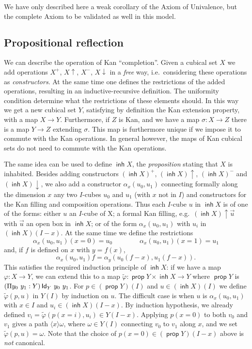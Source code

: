 \documentclass[10pt,a4paper]{article}
\DeclareMathOperator{\inh}{\mathsf{inh}}
\DeclareMathOperator{\propos}{\mathsf{prop}}
\newcommand{\Id}{{\sf Id}}
\newcommand{\rup}[1]{#1{\uparrow}}
\newcommand{\rdo}[1]{#1{\downarrow}}
\newcommand{\bind}[2]{{\langle}#1{\rangle}#2}
\begin{document}
\medskip

 We have only described here a weak corollary of the Axiom of Univalence, but 
the complete Axiom to be validated as well in this model.


\subsection{Propositional reflection}

We can describe the operation of Kan ``completion''. Given a cubical
set $X$ we add operations $X^+$, $\rup X$, $X^-$, $\rdo X$ in
a {\em free} way, i.e.\ considering these operations as {\em
  constructors}.  At the same time one defines the restrictions of the
added operations, resulting in an inductive-recursive definition.  The
uniformity condition determine what the restrictions of these elements
should.  In this way we get a new cubical set $Y$, satisfying by
definition the Kan extension property, with a map $X \to Y$.
Furthermore, if $Z$ is Kan, and we have a map $\sigma:X\to Z$ there is
a map $Y\to Z$ extending $\sigma$.  This map is furthermore unique if
we impose it to commute with the Kan operations.  In general however,
the maps of Kan cubical sets do not need to commute with the Kan
operations.

The same idea can be used to define $\inh X$, the {\em proposition}
stating that $X$ is inhabited.  Besides adding constructors $(\inh
X)^+$, $\rup {(\inh X)}$, $(\inh X)^-$ and $\rdo{(\inh X)}$, we
also add a constructor $\alpha_x(u_0,u_1)$ connecting formally along
the dimension $x$ any two $I$-cubes $u_0$ and $u_1$ (with $x$ not in
$I$) and constructors for the Kan filling and composition operations.
Thus each $I$-cube $u$ in $\inh X$ is of one of the forms: either $u$
an $I$-cube of X; a formal Kan filling, e.g.\ $\rup {(\inh X)} {\vec
  u}$ with $\vec u$ an open box in $\inh X$; or of the form
$\alpha_x(u_0,u_1)$ with $u_i$ in $(\inh X) (I-x)$.  At the same time
we define the restrictions
\[
\alpha_x(u_0,u_1)(x=0) = u_0 \qquad \qquad \alpha_x(u_0,u_1)(x=1) =
u_1
\]
and, if $f$ is defined on $x$ with $y=f(x)$,
\[
\alpha_x(u_0,u_1)f = \alpha_y(u_0(f-x),u_1(f-x)).
\]
This satisfies the required induction principle of $\inh X$: if we
have a map $\varphi : X \to Y$, we can extend this to a map
$\tilde\varphi : \propos Y \times \inh X \to Y$ where $\propos Y$ is
$(\Pi y_0~y_1 : Y) \, \Id_Y~y_0~y_1$.  For $p \in(\propos Y) (I)$ and
$u \in (\inh X) (I)$ we define $\tilde\varphi (p,u)$ in $Y (I)$ by
induction on $u$.  The difficult case is when $u$ is $\alpha_x (u_0,
u_1)$ with $x \in I$ and $u_i \in (\inh X) (I-x)$.  By induction
hypothesis, we already defined $v_i = \tilde\varphi (p (x = i), u_i)
\in Y (I-x)$.  Applying $p (x=0)$ to both $v_0$ and $v_1$ gives a path
$\bind x \omega$, where $\omega \in Y (I)$ connecting $v_0$ to $v_1$
along $x$, and we set $\tilde\varphi (p,u) = \omega$.  Note that the
choice of $p (x = 0) \in (\propos Y) (I-x)$ above is \emph{not}
canonical.
\end{document}
